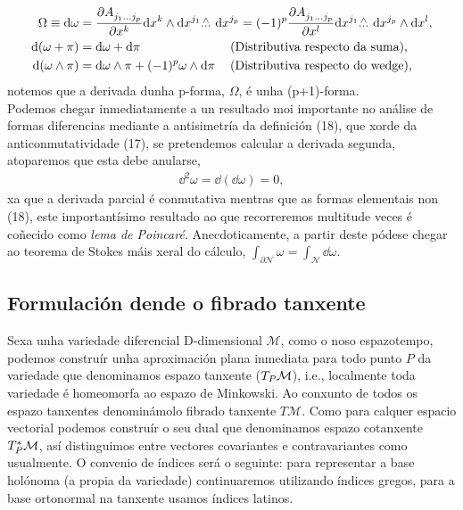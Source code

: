 \begin{align}
    \Omega\equiv\dd\omega &= \diffp{A\indices{_{j_1}_{...}_{j_p}}}{x^k}\dd x^k\wedge \dd x^{j_1}\overset{\wedge}{...}\ \dd x^{j_p} = (-1)^p\diffp{A\indices{_{j_1}_{...}_{j_p}}}{x^l}\dd x^{j_1}\overset{\wedge}{...}\  \dd x^{j_p}\wedge\dd x^l,\\
    \dd(\omega +\pi) &= \dd\omega + \dd\pi\hspace{7.21em}\text{(Distributiva respecto da suma)},\\
    \dd(\omega\wedge\pi) &= \dd\omega\wedge\pi + (-1)^p\omega\wedge \dd\pi\hspace{1.2em}\text{(Distributiva respecto do wedge),}
\end{align}
notemos que a derivada dunha p-forma, $\Omega$, é unha (p+1)-forma.\\
Podemos chegar inmediatamente a un resultado moi importante no análise de formas diferencias mediante a antisimetría da definición (18), que xorde da anticonmutatividade (17), se pretendemos calcular a derivada segunda, atoparemos que esta debe anularse,
\begin{align}
    \dd^2\omega = \dd(\dd\omega) = 0,
\end{align}
xa que a derivada parcial é conmutativa mentras que as formas elementais non (18), este importantísimo resultado ao que recorreremos multitude veces é coñecido como \textit{lema de Poincaré}. Anecdoticamente, a partir deste pódese chegar ao teorema de Stokes máis xeral do cálculo, $\int_{\partial\mathcal{N}}\omega = \int_\mathcal{N}\dd\omega$.



\subsection{Formulación dende o fibrado tanxente}
Sexa unha variedade diferencial D-dimensional $\mathcal{M}$, como o noso espazotempo, podemos construír unha aproximación plana inmediata para todo punto $P$ da variedade que denominamos espazo tanxente ($T_P\mathcal{M}$), i.e., localmente toda variedade é homeomorfa ao espazo de Minkowski. Ao conxunto de todos os espazo tanxentes denominámolo fibrado tanxente $T\mathcal{M}$. Como para calquer espacio vectorial podemos construír o seu dual que denominamos espazo cotanxente $T_P^*\mathcal{M}$, así distinguimos entre vectores covariantes e contravariantes como usualmente. O convenio de índices será o seguinte: para representar a base holónoma (a propia da variedade) continuaremos utilizando índices gregos, para a base ortonormal na tanxente usamos índices latinos. 

